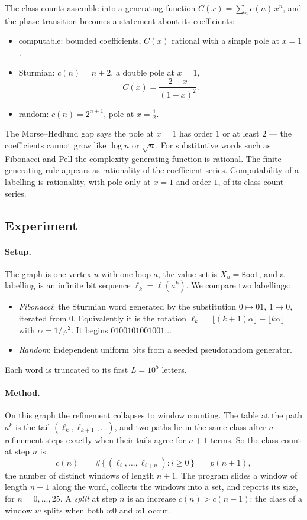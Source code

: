 \documentclass[11pt, a4paper]{article}
\theoremstyle{definition}
\theoremstyle{plain}
\begin{document}
The class counts assemble into a generating function
$C(x) = \sum_n c(n)\, x^n$, and the phase transition becomes a
statement about its coefficients:
\begin{itemize}
  \item computable: bounded coefficients, $C(x)$ rational with a
        simple pole at $x = 1$.
  \item Sturmian: $c(n) = n+2$, a double pole at $x = 1$,
        \[
          C(x) = \frac{2 - x}{(1-x)^2}.
        \]
  \item random: $c(n) = 2^{n+1}$, pole at $x = \tfrac12$.
\end{itemize}
The Morse--Hedlund gap says the pole at $x = 1$ has order $1$ or at
least $2$ --- the coefficients cannot grow like $\log n$ or
$\sqrt{n}$.  For substitutive words such as Fibonacci and Pell the
complexity generating function is rational.  The finite generating
rule appears as rationality of the coefficient series.
Computability of a labelling is rationality, with pole only at
$x = 1$ and order $1$, of its class-count series.

\subsection{Experiment}\label{sec:refinement-experiment}

\paragraph{Setup.}
The graph is one vertex $u$ with one loop $a$, the value set is
$X_u = \texttt{Bool}$, and a labelling is an infinite bit sequence
$\ell_k = \ell(a^k)$.  We compare two labellings:
\begin{itemize}
  \item \emph{Fibonacci}: the Sturmian word generated by the
        substitution $0 \mapsto 01$, $1 \mapsto 0$, iterated from
        $0$.  Equivalently it is the rotation
        $\ell_k = \lfloor (k+1)\alpha \rfloor - \lfloor k\alpha
        \rfloor$ with $\alpha = 1/\varphi^2$.  It begins
        $0100101001001\dots$
  \item \emph{Random}: independent uniform bits from a seeded
        pseudorandom generator.
\end{itemize}
Each word is truncated to its first $L = 10^5$ letters.

\paragraph{Method.}
On this graph the refinement collapses to window counting.  The
table at the path $a^k$ is the tail $(\ell_k, \ell_{k+1}, \dots)$,
and two paths lie in the same class after $n$ refinement steps
exactly when their tails agree for $n+1$ terms.  So the class count
at step $n$ is
\[
  c(n) \;=\; \#\{\, (\ell_i, \dots, \ell_{i+n}) : i \geq 0 \,\}
  \;=\; p(n+1),
\]
the number of distinct windows of length $n+1$.  The program slides
a window of length $n+1$ along the word, collects the windows into a
set, and reports its size, for $n = 0, \dots, 25$.  A \emph{split}
at step $n$ is an increase $c(n) > c(n-1)$: the class of a window
$w$ splits when both $w0$ and $w1$ occur.
\end{document}
